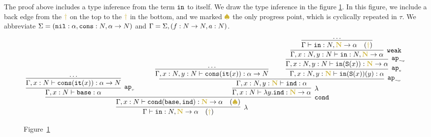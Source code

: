 \documentclass{article}
\begin{document}
The proof above includes a type inference from the term ${\tt in}$ to itself.
We draw the type inference in the figure \ref{figure-term-interval}. 
In this figure, we include a back edge from the 
$\bfColor{oldgold}{\dagger}$ on the top to the $\bfColor{oldgold}{\dagger}$ in the bottom,
and we marked $\bfColor{oldgold}{ \spadesuit}$ the only progress point, which is cyclically repeated
in $\tau$.
We abbreviate 
$\Sigma = ({\tt nil}:\alpha, {\tt cons}:{N},\alpha \rightarrow {N})$
and
$\Gamma = \Sigma,(f:{N} \rightarrow {N}, a:{N})$.

\begin{figure}
\label{figure-term-interval}


\begin{center}
  
\[
   {\infer[\lambda]  
     {\Gamma \vdash \interval:\N,\bfColor{oldgold}{\N}\rightarrow\alpha 
       \ \ \ (\bfColor{oldgold}{\dagger}) }
       {\infer[\cond]{\Gamma, x:\N 
	\vdash 
	\cond (\base,  \inductive )
	:\bfColor{oldgold}{\N}\rightarrow\alpha \ \ \ (\bfColor{oldgold}{ \spadesuit}) } 
       {\infer[\apvar]{\Gamma, x:\N 
	           \vdash 
	           \base:\alpha}
             {\infer[]{\Gamma, x:\N 
	           \vdash 
	           \cons(\iter(x)):\alpha \rightarrow\N}{\ldots}}
            {\ \ \ \ \ \ }  &
          \infer[\lambda]{\Gamma, x:\N 
	           \vdash 
	           \lambda y.\inductive : \bfColor{oldgold}{\N}\rightarrow\alpha}
             {\infer[\apnotvar]{\Gamma, x:\N, y:\bfColor{oldgold}{\N} \vdash
               \inductive : \alpha}
            {\infer[]
                     {\Gamma, x:\N, y:\N 
                          \vdash \cons(\iter(x)):\alpha\rightarrow\N}{\ldots}
               {\ \ \ \ \ \ }
                     {\infer[\apvar]{\Gamma, x:\N, y:\bfColor{oldgold}{\N} 
                          \vdash \interval(\Succ(x))(y):\alpha}
                         {\infer[\apnotvar]{\Gamma, x:\N, y:\N 
                          \vdash \interval(\Succ(x)):\bfColor{oldgold}{\N} \rightarrow\alpha}
                              {\infer[\weak]{\Gamma, x:\N, y:\N 
                          \vdash \interval:\N,\bfColor{oldgold}{\N} \rightarrow\alpha}
                                {\infer[]{\Gamma 
                          \vdash \interval:\N,\bfColor{oldgold}{\N} \rightarrow\alpha
                           \ \ \ (\bfColor{oldgold}{\dagger})}
              {\ldots}}}}}
             }
           }
         }
       }  
    }
\]

\mbox{Figure \ref{figure-term-interval}}
\end{center}

\end{figure}
\end{document}
